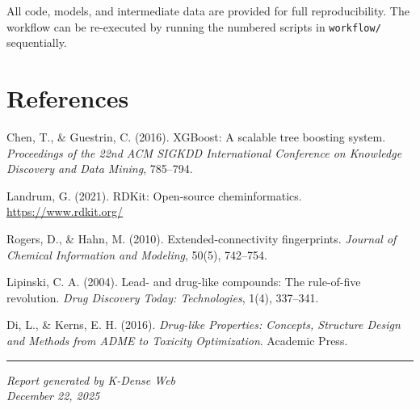 \documentclass[11pt,a4paper]{article}
\begin{document}
All code, models, and intermediate data are provided for full reproducibility. The workflow can be re-executed by running the numbered scripts in \texttt{workflow/} sequentially.


\section*{References}

\noindent[1] Chen, T., \& Guestrin, C. (2016). XGBoost: A scalable tree boosting system. \textit{Proceedings of the 22nd ACM SIGKDD International Conference on Knowledge Discovery and Data Mining}, 785--794.

\noindent[2] Landrum, G. (2021). RDKit: Open-source cheminformatics. \url{https://www.rdkit.org/}

\noindent[3] Rogers, D., \& Hahn, M. (2010). Extended-connectivity fingerprints. \textit{Journal of Chemical Information and Modeling}, 50(5), 742--754.

\noindent[4] Lipinski, C. A. (2004). Lead- and drug-like compounds: The rule-of-five revolution. \textit{Drug Discovery Today: Technologies}, 1(4), 337--341.

\noindent[5] Di, L., \& Kerns, E. H. (2016). \textit{Drug-like Properties: Concepts, Structure Design and Methods from ADME to Toxicity Optimization}. Academic Press.

\vspace{1cm}
\noindent\rule{\textwidth}{0.4pt}
\begin{center}
\textit{Report generated by K-Dense Web}\\
\textit{December 22, 2025}
\end{center}
\end{document}

